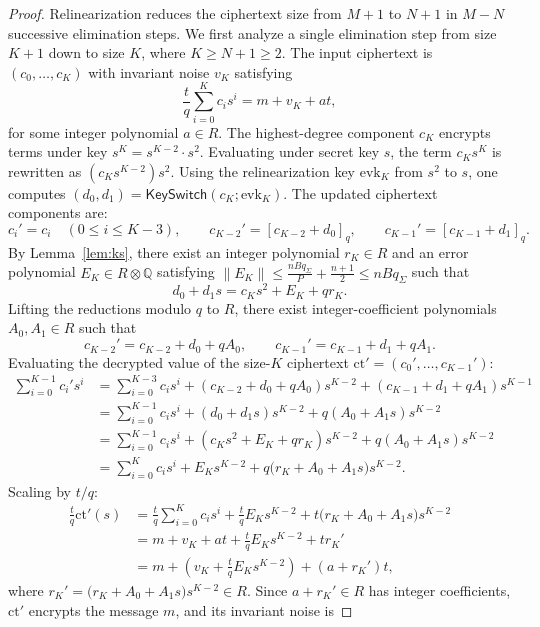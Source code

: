 \documentclass[11pt]{article}
\theoremstyle{definition}
\theoremstyle{remark}
\newcommand{\norm}[1]{\left\lVert #1\right\rVert}
\newcommand{\ct}{\mathrm{ct}}
\newcommand{\KS}{\mathsf{KeySwitch}}
\begin{document}
\begin{proof}
Relinearization reduces the ciphertext size from $M+1$ to $N+1$ in $M-N$ successive elimination steps.
We first analyze a single elimination step from size $K+1$ down to size $K$, where $K \geq N+1 \geq 2$.
The input ciphertext is $(c_0, \dots, c_K)$ with invariant noise $v_K$ satisfying
\[
  \frac{t}{q}\sum_{i=0}^K c_i s^i = m + v_K + at,
\]
for some integer polynomial $a \in R$.
The highest-degree component $c_K$ encrypts terms under key $s^K = s^{K-2} \cdot s^2$.
Evaluating under secret key $s$, the term $c_K s^K$ is rewritten as $(c_K s^{K-2}) s^2$.
Using the relinearization key $\mathrm{evk}_K$ from $s^2$ to $s$, one computes $(d_0, d_1) = \KS(c_K; \mathrm{evk}_K)$.
The updated ciphertext components are:
\[
  c_i' = c_i \quad (0 \leq i \leq K-3), \qquad
  c_{K-2}' = [c_{K-2} + d_0]_q, \qquad
  c_{K-1}' = [c_{K-1} + d_1]_q.
\]
By Lemma~\ref{lem:ks}, there exist an integer polynomial $r_K \in R$ and an error polynomial $E_K \in R \otimes \mathbb{Q}$ satisfying $\norm{E_K} \leq \frac{n B q_\Sigma}{P} + \frac{n+1}{2} \leq n B q_\Sigma$ such that
\[
  d_0 + d_1 s = c_K s^2 + E_K + q r_K.
\]
Lifting the reductions modulo $q$ to $R$, there exist integer-coefficient polynomials $A_0, A_1 \in R$ such that
\[
  c_{K-2}' = c_{K-2} + d_0 + q A_0, \qquad c_{K-1}' = c_{K-1} + d_1 + q A_1.
\]
Evaluating the decrypted value of the size-$K$ ciphertext $\ct' = (c_0', \dots, c_{K-1}')$:
\begin{align*}
  \sum_{i=0}^{K-1} c_i' s^i
  &= \sum_{i=0}^{K-3} c_i s^i + (c_{K-2} + d_0 + q A_0) s^{K-2} + (c_{K-1} + d_1 + q A_1) s^{K-1}\\
  &= \sum_{i=0}^{K-1} c_i s^i + (d_0 + d_1 s) s^{K-2} + q (A_0 + A_1 s) s^{K-2}\\
  &= \sum_{i=0}^{K-1} c_i s^i + (c_K s^2 + E_K + q r_K) s^{K-2} + q (A_0 + A_1 s) s^{K-2}\\
  &= \sum_{i=0}^K c_i s^i + E_K s^{K-2} + q \bigl(r_K + A_0 + A_1 s\bigr) s^{K-2}.
\end{align*}
Scaling by $t/q$:
\begin{align*}
  \frac{t}{q}\ct'(s)
  &= \frac{t}{q}\sum_{i=0}^K c_i s^i + \frac{t}{q} E_K s^{K-2} + t \bigl(r_K + A_0 + A_1 s\bigr) s^{K-2}\\
  &= m + v_K + at + \frac{t}{q} E_K s^{K-2} + t r_K'\\
  &= m + \left(v_K + \frac{t}{q} E_K s^{K-2}\right) + (a + r_K')t,
\end{align*}
where $r_K' = \bigl(r_K + A_0 + A_1 s\bigr) s^{K-2} \in R$.
Since $a + r_K' \in R$ has integer coefficients, $\ct'$ encrypts the message $m$, and its invariant noise is

\end{proof}
\end{document}
